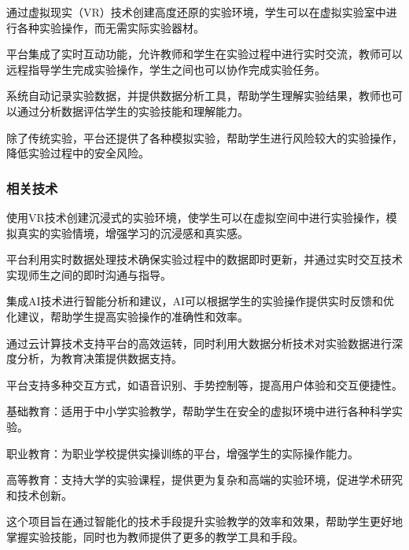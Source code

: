 通过虚拟现实（VR）技术创建高度还原的实验环境，学生可以在虚拟实验室中进行各种实验操作，而无需实际实验器材。

平台集成了实时互动功能，允许教师和学生在实验过程中进行实时交流，教师可以远程指导学生完成实验操作，学生之间也可以协作完成实验任务。

系统自动记录实验数据，并提供数据分析工具，帮助学生理解实验结果，教师也可以通过分析数据评估学生的实验技能和理解能力。

除了传统实验，平台还提供了各种模拟实验，帮助学生进行风险较大的实验操作，降低实验过程中的安全风险。

\subsubsection{相关技术}


使用VR技术创建沉浸式的实验环境，使学生可以在虚拟空间中进行实验操作，模拟真实的实验情境，增强学习的沉浸感和真实感。

平台利用实时数据处理技术确保实验过程中的数据即时更新，并通过实时交互技术实现师生之间的即时沟通与指导。

集成AI技术进行智能分析和建议，AI可以根据学生的实验操作提供实时反馈和优化建议，帮助学生提高实验操作的准确性和效率。

通过云计算技术支持平台的高效运转，同时利用大数据分析技术对实验数据进行深度分析，为教育决策提供数据支持。

平台支持多种交互方式，如语音识别、手势控制等，提高用户体验和交互便捷性。

基础教育：适用于中小学实验教学，帮助学生在安全的虚拟环境中进行各种科学实验。

职业教育：为职业学校提供实操训练的平台，增强学生的实际操作能力。

高等教育：支持大学的实验课程，提供更为复杂和高端的实验环境，促进学术研究和技术创新。

这个项目旨在通过智能化的技术手段提升实验教学的效率和效果，帮助学生更好地掌握实验技能，同时也为教师提供了更多的教学工具和手段。
